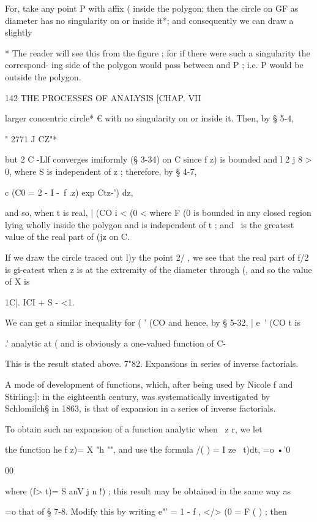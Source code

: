 {For, take any point P with affix ( inside the polygon; then the circle
on GF as diameter has no singularity on or inside it*; and
consequently we can draw a slightly

* The reader will see this from the figure ; for if there were such a
singularity the correspond- ing side of the polygon would pass between
and P ; i.e. P would be outside the polygon.



142 THE PROCESSES OF ANALYSIS [CHAP. VII

larger concentric circle* € with no singularity on or inside it. Then,
by § 5-4,

" 2771 J CZ"*

but 2 C -Llf converges imiformly (§ 3-34) on C since f z) is bounded
and l 2 j 8 > 0, where S is independent of z ; therefore, by § 4-7,

c (C0 = 2 - I -\ f .z) exp Ctz-') dz,

and so, when t is real, | (CO i < (0 < where F (0 is bounded in any
closed region lying wholly inside the polygon and is independent of t
; and \ is the greatest value of the real part of (jz on C.

If we draw the circle traced out l)y the point 2/ , we see that the
real part of f/2 is gi-eatest when z is at the extremity of the
diameter through (, and so the value of X is

1C|. ICI + S - <1.

We can get a similar inequality for ( ' (CO and hence, by § 5-32, |
e~' (CO t is

.' analytic at ( and is obviously a one-valued function of C-

This is the result stated above. 7"82. Expansions in series of inverse
factorials.

A mode of development of functions, which, after being used by Nicole
f and Stirling:]: in the eighteenth century, was systematically
investigated by Schlomilch§ in 1863, is that of expansion in a series
of inverse factorials.

To obtain such an expansion of a function analytic when \ z r, we let

the function he f z)= X "h "", and use the formula /( ) = I ze~ t)dt,
=o •'0

00

where (f> t)= S anV j n !) ; this result may be obtained in the same
way as

 =o that of § 7-8. Modify this by writing e"' = 1 - f , </> (0 = F ( )
; then

}

